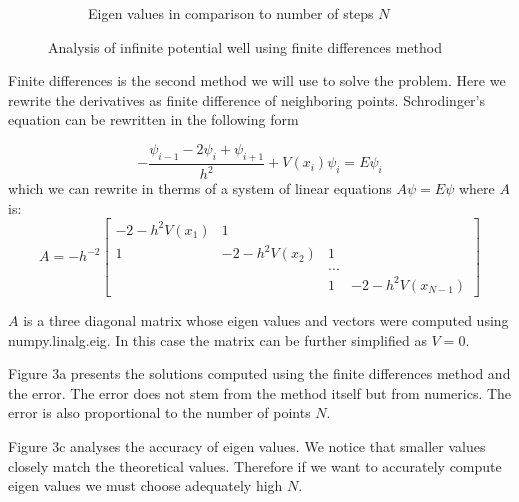 \documentclass[12pt, a4paper]{article}
\begin{document}
\begin{figure}[hbtp]
\begin{subfigure}{0.5\textwidth}
  \caption{Eigen values in comparison to number of steps $N$} \label{fig:b}
  \end{subfigure}
  
\caption{Analysis of infinite potential well using finite differences method} \label{fig:1}
\end{figure}

Finite differences is the second method we will use to solve the problem. Here we rewrite the derivatives as finite difference of neighboring points. Schrodinger's equation can be rewritten in the following form

\begin{equation*}
    -\frac{\psi_{i-1}-2\psi_i + \psi_{i+1} }{h^2} + V(x_i)\psi_i = E\psi_i
\end{equation*}
which we can rewrite in therms of a system of linear equations $A\psi = E\psi$ where $A$ is:
\begin{equation*}
    A = -h^{-2}
    \begin{bmatrix}
    -2-h^2V(x_1)&1\\
    1&-2-h^2V(x_2)&1\\
    &&...\\
    &&1&-2-h^2V(x_{N-1})
    \end{bmatrix}
\end{equation*}

$A$ is a three diagonal matrix whose eigen values and vectors were computed using {\sc numpy.linalg.eig}. In this case the matrix can be further simplified as $V = 0$.

Figure 3a presents the solutions computed using the finite differences method and the error. The error does not stem from the method itself but from numerics. The error is also proportional to the number of points $N$.

Figure 3c analyses the accuracy of eigen values. We notice that smaller values closely match the theoretical values. Therefore if we want to accurately compute eigen values we must choose adequately high $N$.
\end{document}
